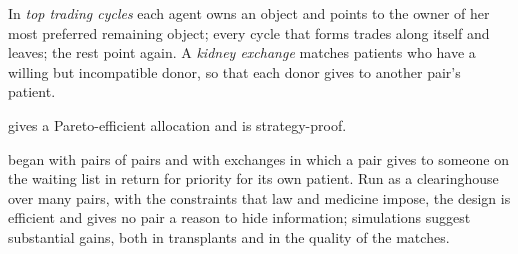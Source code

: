 \begin{definition}\label{def:b3:auctions-and-market-design:ttc}
In \emph{top trading cycles} each agent owns an object and points to the owner of her
most preferred remaining object; every cycle that forms trades along itself and
leaves; the rest point again. A \emph{kidney exchange} matches patients who have a
willing but incompatible donor, so that each donor gives to another pair's patient.
\end{definition}

\begin{proposition}\label{prop:b3:auctions-and-market-design:ttc}
 gives a Pareto-efficient allocation and is strategy-proof.
\end{proposition}
\admitted

\begin{omfigure}
\par{}
\end{omfigure}

 began with pairs of pairs and with exchanges in which a pair gives to
someone on the waiting list in return for priority for its own patient. Run as a
clearinghouse over many pairs, with the constraints that law and medicine impose,
the design is efficient and gives no pair a reason to hide information; simulations
suggest substantial gains, both in transplants and in the quality of the matches.

